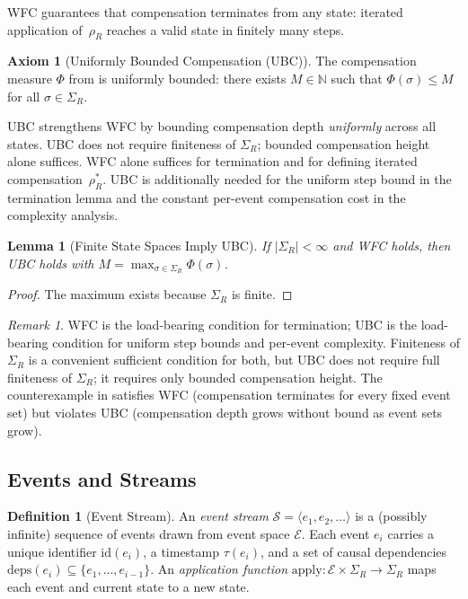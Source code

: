 \documentclass[11pt,a4paper]{article}
\theoremstyle{plain}
\newtheorem{lemma}[theorem]{Lemma}
\theoremstyle{definition}
\newtheorem{definition}[theorem]{Definition}
\newtheorem{axiom}[theorem]{Axiom}
\theoremstyle{remark}
\newtheorem{remark}[theorem]{Remark}
\renewcommand{\_}{\textunderscore\allowbreak}
\begin{document}
WFC guarantees that compensation terminates from any state: iterated
application of~$\rho_R$ reaches a valid state in finitely many steps.

\begin{axiom}[Uniformly Bounded Compensation (UBC)]
\label{ax:ubc}
The compensation measure $\Phi$ from  is uniformly bounded:
there exists $M \in \mathbb{N}$ such that $\Phi(\sigma) \leq M$ for all
$\sigma \in \Sigma_R$.
\end{axiom}

UBC strengthens WFC by bounding compensation depth \emph{uniformly} across
all states.  UBC does not require finiteness of $\Sigma_R$; bounded
compensation height alone suffices.  WFC alone suffices for termination and
for defining iterated
compensation~$\rho_R^*$.  UBC is additionally needed for the uniform
step bound in the termination lemma and the constant per-event compensation
cost in the complexity analysis.

\begin{lemma}[Finite State Spaces Imply UBC]
\label{lem:finite-implies-ubc}
If $|\Sigma_R| < \infty$ and WFC holds, then UBC holds with
$M = \max_{\sigma \in \Sigma_R} \Phi(\sigma)$.
\end{lemma}
\begin{proof}
The maximum exists because $\Sigma_R$ is finite.
\end{proof}

\begin{remark}
WFC is the load-bearing condition for termination; UBC is the load-bearing
condition for uniform step bounds and per-event complexity.  Finiteness of
$\Sigma_R$ is a convenient sufficient condition for both, but UBC does not
require full finiteness of $\Sigma_R$; it requires only bounded compensation
height.  The counterexample
in  satisfies WFC (compensation terminates for every fixed
event set) but violates UBC (compensation depth grows without bound as event
sets grow).
\end{remark}

\subsection{Events and Streams}

\begin{definition}[Event Stream]
\label{def:stream}
An \emph{event stream} $\mathcal{S} = \langle e_1, e_2, \ldots \rangle$ is a
(possibly infinite) sequence of events drawn from event space $\mathcal{E}$.
Each event $e_i$ carries a unique identifier $\mathrm{id}(e_i)$, a timestamp
$\tau(e_i)$, and a set of causal dependencies
$\mathrm{deps}(e_i) \subseteq \{e_1, \ldots, e_{i-1}\}$.  An
\emph{application function}
$\mathrm{apply}: \mathcal{E} \times \Sigma_R \to \Sigma_R$ maps each event
and current state to a new state.
\end{definition}
\end{document}
